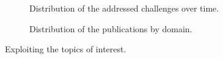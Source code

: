 \begin{figure}
  \centering
  \begin{subfigure}{0.48\textwidth}
    \centering
    
    \caption{
      Distribution of the addressed challenges over time.
      \label{fig:sota.challenges}
    }
  \end{subfigure}
  \hfill
  \begin{subfigure}{0.48\textwidth}
    \centering
    
    \caption{
      Distribution of the publications by domain.
      \label{fig:sota.domains}
    }
  \end{subfigure}
  \caption{
    Exploiting the topics of interest.
    \label{fig:sota.challenges-domains}
  }
\end{figure}
